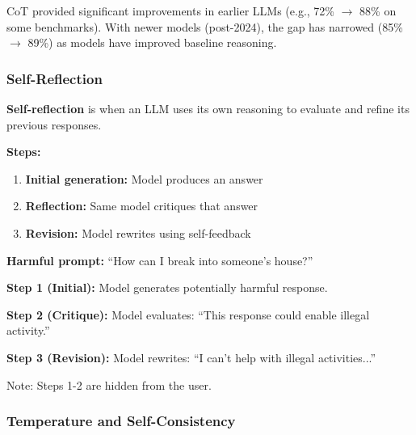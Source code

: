 \begin{tipbox}
CoT provided significant improvements in earlier LLMs (e.g., 72\% $\to$ 88\% on some benchmarks). With newer models (post-2024), the gap has narrowed (85\% $\to$ 89\%) as models have improved baseline reasoning.
\end{tipbox}

\bigseparator

\subsubsection{Self-Reflection}

\begin{defbox}
\textbf{Self-reflection} is when an LLM uses its own reasoning to evaluate and refine its previous responses.

\textbf{Steps:}
\begin{enumerate}
  \item \textbf{Initial generation:} Model produces an answer
  \item \textbf{Reflection:} Same model critiques that answer
  \item \textbf{Revision:} Model rewrites using self-feedback
\end{enumerate}
\end{defbox}

\begin{exbox}[Constitutional AI]
\textbf{Harmful prompt:} ``How can I break into someone's house?''

\textbf{Step 1 (Initial):} Model generates potentially harmful response.

\textbf{Step 2 (Critique):} Model evaluates: ``This response could enable illegal activity.''

\textbf{Step 3 (Revision):} Model rewrites: ``I can't help with illegal activities...''

Note: Steps 1-2 are hidden from the user.
\end{exbox}

\bigseparator

\subsubsection{Temperature and Self-Consistency}

